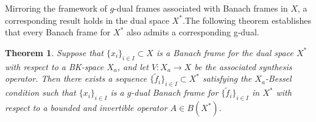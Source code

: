 \documentclass[12pt]{article}
\newtheorem{theorem}{Theorem}[section]
\theoremstyle{definition}
\theoremstyle{remark}
\begin{document}
Mirroring the framework of \( g \)-dual frames associated with Banach frames in \( X \), a corresponding result holds in the dual space \( X^* \).The following theorem establishes that every Banach frame for \( X^* \) also admits a corresponding g-dual.
\begin{theorem}
Suppose that \(\{x_i\}_{i\in I}\subset X\) is a Banach frame for the dual space \(X^*\) with respect to a BK-space \(X_a\), and let
\(V:X_a\to X\) be the associated synthesis operator. Then there exists a sequence
\(\{\tilde{f}_i\}_{i\in I}\subset X^*\) satisfying the \(X_a\)-Bessel condition such that
\(\{x_i\}_{i\in I}\) is a \(g\)-dual Banach frame for
\(\{\tilde{f}_i\}_{i\in I}\) in \(X^*\) with respect to a bounded and invertible
operator \(A\in B(X^*)\).

\end{theorem}
\end{document}
